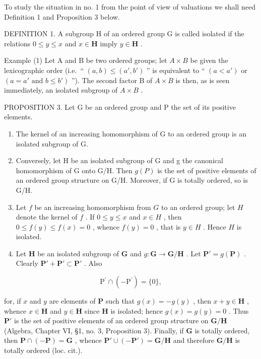 To study the situation in no. 1 from the point of view of valuations we shall need Definition 1 and Proposition 3 below.

DEFINITION 1. A subgroup H of an ordered group G is called isolated if the relations \(0 \leqslant y \leqslant x\) and \(x \in \mathbf{H}\) imply \(y \in \mathbf{H}\) .

Example (1) Let A and B be two ordered groups; let \(A \times B\) be given the lexicographic order (i.e.~`` \((a, b) \leqslant (a', b')\) '' is equivalent to `` \((a < a')\) or \((a = a' \text{ and } b \leqslant b')\) ''). The second factor B of \(A \times B\) is then, as is seen immediately, an isolated subgroup of \(A \times B\) .

PROPOSITION 3. Let G be an ordered group and P the set of its positive elements.

\begin{enumerate}
\def\labelenumi{(\alph{enumi})}
\item
  The kernel of an increasing homomorphism of G to an ordered group is an isolated subgroup of G.
\item
  Conversely, let H be an isolated subgroup of G and g the canonical homomorphism of G onto G/H. Then \(g(P)\) is the set of positive elements of an ordered group structure on G/H. Moreover, if G is totally ordered, so is G/H.
\item
  Let \(f\) be an increasing homomorphism from \(G\) to an ordered group; let \(H\) denote the kernel of \(f\) . If \(0 \leqslant y \leqslant x\) and \(x \in H\) , then \(0 \leqslant f(y) \leqslant f(x) = 0\) , whence \(f(y) = 0\) , that is \(y \in H\) . Hence \(H\) is isolated.
\item
  Let \(\mathbf{H}\) be an isolated subgroup of \(\mathbf{G}\) and \(g\colon \mathbf{G}\to \mathbf{G} / \mathbf{H}\) . Let \(\mathbf{P}' = g(\mathbf{P})\) . Clearly \(\mathbf{P}' + \mathbf{P}'\subset \mathbf{P}'\) . Also
\end{enumerate}

\[
\mathrm{P} ^ {\prime} \cap (- \mathrm{P} ^ {\prime}) = \{0 \},
\]

for, if \(x\) and \(y\) are elements of \(\mathbf{P}\) such that \(g(x) = -g(y)\) , then \(x + y \in \mathbf{H}\) , whence \(x \in \mathbf{H}\) and \(y \in \mathbf{H}\) since \(\mathbf{H}\) is isolated; hence \(g(x) = g(y) = 0\) . Thus \(\mathbf{P}'\) is the set of positive elements of an ordered group structure on \(\mathbf{G} / \mathbf{H}\) (Algebra, Chapter VI, §1, no. 3, Proposition 3). Finally, if \(\mathbf{G}\) is totally ordered, then \(\mathbf{P} \cap (-\mathbf{P}) = \mathbf{G}\) , whence \(\mathbf{P}' \cup (-\mathbf{P}') = \mathbf{G} / \mathbf{H}\) and therefore \(\mathbf{G} / \mathbf{H}\) is totally ordered (loc. cit.).

